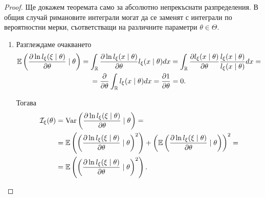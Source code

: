 \documentclass[numbers=endperiod, DIV=15, bibliography=totocnumbered]{scrartcl}
\begin{document}
\begin{proof}
  Ще докажем теоремата само за абсолютно непрекъснати разпределения. В общия случай римановите интеграли могат да се заменят с интеграли по вероятностни мерки, съответстващи на различните параметри $\theta \in \Theta$.
  \begin{enumerate}
    \item Разглеждаме очакването
    \begin{multline*}
      \mathbb{E}\left( \frac {\partial \ln l_\xi(\xi \mid \theta)} {\partial \theta} \mid \theta \right)
      =
      \int_{\mathbb{R}} \frac {\partial \ln l_\xi(x \mid \theta)} {\partial \theta} l_\xi(x \mid \theta) dx
      =
      \int_{\mathbb{R}} \frac {\partial l_\xi(x \mid \theta)} {\partial \theta} \frac {l_\xi(x \mid \theta)} {l_\xi(x \mid \theta)} dx
      = \\ =
      \frac \partial {\partial \theta} \int_{\mathbb{R}} l_\xi(x \mid \theta) dx
      =
      \frac {\partial 1} {\partial \theta}
      =
      0.
    \end{multline*}

    Тогава
    \begin{align*}
      \mathcal{I}_\xi(\theta)
      &=
      \operatorname{Var}\left( \frac {\partial \ln l_\xi(\xi \mid \theta)} {\partial \theta} \mid \theta \right)
      = \\ &=
      \mathbb{E}\left( {\left( \frac {\partial \ln l_\xi(\xi \mid \theta)} {\partial \theta} \mid \theta \right)}^2 \right) + {\left(\mathbb{E}\left( \frac {\partial \ln l_\xi(\xi \mid \theta)} {\partial \theta} \mid \theta \right)\right)}^2
      = \\ &=
      \mathbb{E}\left( {\left( \frac {\partial \ln l_\xi(\xi \mid \theta)} {\partial \theta} \mid \theta \right)}^2 \right).
    \end{align*}


\end{enumerate}
\end{proof}
\end{document}
